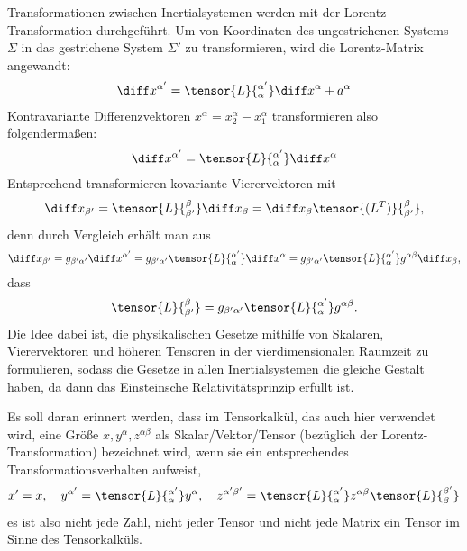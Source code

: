 Transformationen zwischen Inertialsystemen werden mit der Lorentz-Transformation durchgeführt.
Um von Koordinaten des ungestrichenen Systems $\Sigma$ in das gestrichene System $\Sigma'$ zu transformieren, wird die Lorentz-Matrix angewandt:
\begin{align*}
    \diff x^{\alpha'}=\tensor{L}{^{\alpha'}_\alpha}\diff x^\alpha + a^\alpha
\end{align*}
Kontravariante Differenzvektoren $x^\alpha=x^\alpha_2-x^\alpha_1$ transformieren also folgendermaßen:
\begin{align*}
    \diff x^{\alpha'}=\tensor{L}{^{\alpha'}_\alpha}\diff x^\alpha
\end{align*}
Entsprechend transformieren kovariante Vierervektoren mit
\begin{align*}
    \diff x_{\beta'}=\tensor{L}{_{\beta'}^\beta}\diff x_\beta =\diff x_\beta \tensor{(L^T)}{^\beta_{\beta'}},
\end{align*}
denn durch Vergleich erhält man aus
\begin{align*}
    \diff x_{\beta'}=g_{\beta'\alpha'}\diff x^{\alpha'}=g_{\beta'\alpha'}\tensor{L}{^{\alpha'}_\alpha}\diff x^\alpha=g_{\beta'\alpha'}\tensor{L}{^{\alpha'}_\alpha}g^{\alpha\beta}\diff x_\beta,
\end{align*}
dass
\begin{align*}
    \tensor{L}{_{\beta'}^\beta}=g_{\beta'\alpha'}\tensor{L}{^{\alpha'}_\alpha}g^{\alpha\beta}.
\end{align*}
Die Idee dabei ist, die physikalischen Gesetze mithilfe von Skalaren, Vierervektoren und höheren Tensoren in der vierdimensionalen Raumzeit zu formulieren, sodass die Gesetze in allen Inertialsystemen die gleiche Gestalt haben, da dann das Einsteinsche Relativitätsprinzip erfüllt ist.

Es soll daran erinnert werden, dass im Tensorkalkül, das auch hier verwendet wird, eine Größe $x,y^\alpha,z^{\alpha\beta}$ als Skalar/Vektor/Tensor (bezüglich der Lorentz-Transformation) bezeichnet wird, wenn sie ein entsprechendes Transformationsverhalten aufweist,
\begin{align*}
    x' = x , \quad y^{\alpha'}=\tensor{L}{^{\alpha'}_\alpha}y^\alpha, \quad z^{\alpha'\beta'}=\tensor{L}{^{\alpha'}_\alpha}z^{\alpha\beta}\tensor{L}{_\beta^{\beta'}}
\end{align*}
\textendash{} es ist also nicht jede Zahl, nicht jeder Tensor und nicht jede Matrix ein Tensor im Sinne des Tensorkalküls.

